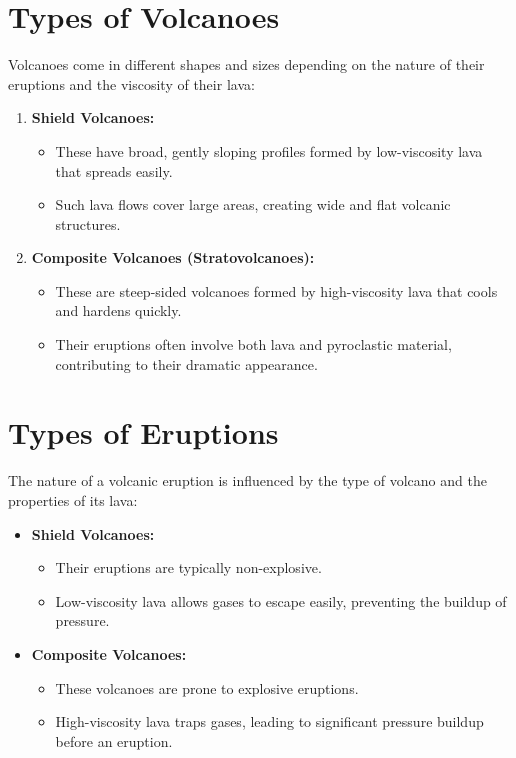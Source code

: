 \documentclass{article}
\begin{document}
\section*{Types of Volcanoes}

Volcanoes come in different shapes and sizes depending on the nature of their eruptions and the viscosity of their lava:

\begin{enumerate}
    \item \textbf{Shield Volcanoes:}
    \begin{itemize}
        \item These have broad, gently sloping profiles formed by low-viscosity lava that spreads easily.
        \item Such lava flows cover large areas, creating wide and flat volcanic structures.
    \end{itemize}

    \item \textbf{Composite Volcanoes (Stratovolcanoes):}
    \begin{itemize}
        \item These are steep-sided volcanoes formed by high-viscosity lava that cools and hardens quickly.
        \item Their eruptions often involve both lava and pyroclastic material, contributing to their dramatic appearance.
    \end{itemize}
\end{enumerate}

\section*{Types of Eruptions}

The nature of a volcanic eruption is influenced by the type of volcano and the properties of its lava:

\begin{itemize}
    \item \textbf{Shield Volcanoes:}
    \begin{itemize}
        \item Their eruptions are typically non-explosive.
        \item Low-viscosity lava allows gases to escape easily, preventing the buildup of pressure.
    \end{itemize}

    \item \textbf{Composite Volcanoes:}
    \begin{itemize}
        \item These volcanoes are prone to explosive eruptions.
        \item High-viscosity lava traps gases, leading to significant pressure buildup before an eruption.
    \end{itemize}
\end{itemize}
\end{document}
